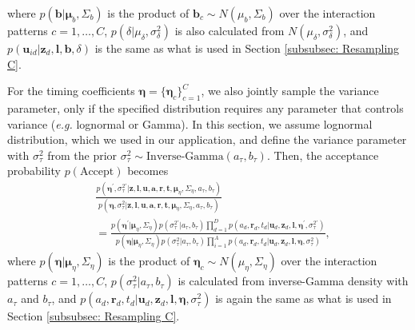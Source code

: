 \documentclass[twoside]{article}
\begin{document}
     	      where $p(\boldsymbol{b}|\boldsymbol{\mu}_b, \Sigma_b)$ is the product of $\boldsymbol{b}_c\sim N(\mu_{b}, \Sigma_{b})$ over the interaction patterns $c =1,\ldots, C$, $p(\delta|\mu_\delta, \sigma^2_\delta)$ is also calculated from $N(\mu_\delta, \sigma^2_\delta)$, and $p(\boldsymbol{u}_{id}| \boldsymbol{z}_d,  \boldsymbol{l}, \boldsymbol{b}, \delta)$ is the same as what is used in Section \ref{subsubsec: Resampling C}. 
     	       
  For the timing coefficients $\boldsymbol{\eta} =\{\boldsymbol{\eta}_c\}_{c=1}^C$, we also jointly sample the variance parameter, only if the specified distribution requires any parameter that controls variance (\textit{e.g.} lognormal or Gamma). In this section, we assume lognormal distribution, which we used in our application, and define the variance parameter with $\sigma_\tau^2$ from the prior $\sigma_\tau^2 \sim \mbox{Inverse-Gamma}(a_\tau, b_\tau)$. Then, the acceptance probability $p(\mbox{Accept})$ becomes
    \begin{equation*}
    \begin{aligned}
       &\frac{p(\boldsymbol{\eta}^\prime,\sigma_\tau^{2\prime}|  \boldsymbol{z},\boldsymbol{l}, \boldsymbol{u},\boldsymbol{a}, \boldsymbol{r}, \boldsymbol{t},\boldsymbol{\mu}_\eta, \Sigma_\eta, a_\tau, b_\tau)}{p(\boldsymbol{\eta}, \sigma_\tau^{2}|\boldsymbol{z},\boldsymbol{l}, \boldsymbol{u},\boldsymbol{a}, \boldsymbol{r}, \boldsymbol{t},\boldsymbol{\mu}_\eta, \Sigma_\eta, a_\tau, b_\tau)}
       \\& =\frac{p(\boldsymbol{\eta}^\prime|\boldsymbol{\mu}_\eta, \Sigma_\eta) p(\sigma_\tau^{2\prime}|a_\tau, b_\tau)\prod\limits_{d=1}^D p({a}_{d}, \boldsymbol{r}_d, t_d| \boldsymbol{u}_d, \boldsymbol{z}_d,  \boldsymbol{l}, \boldsymbol{\eta}^\prime, \sigma_\tau^{2\prime})}{p(\boldsymbol{\eta}|\boldsymbol{\mu}_\eta, \Sigma_\eta) p(\sigma_\tau^2|a_\tau, b_\tau)\prod\limits_{i=1}^A p({a}_{d}, \boldsymbol{r}_d, t_d| \boldsymbol{u}_d, \boldsymbol{z}_d,  \boldsymbol{l}, \boldsymbol{\eta}, \sigma_\tau^{2})},
    \end{aligned}
    \end{equation*}
       where $p(\boldsymbol{\eta}|\boldsymbol{\mu}_\eta, \Sigma_\eta)$ is the product of $\boldsymbol{\eta}_c\sim N(\mu_{\eta}, \Sigma_{\eta})$ over the interaction patterns $c =1,\ldots, C$, $p(\sigma_\tau^{2}|a_\tau, b_\tau)$ is calculated from inverse-Gamma density with $a_\tau$ and $b_\tau$, and $p({a}_{d}, \boldsymbol{r}_d, t_d| \boldsymbol{u}_d, \boldsymbol{z}_d,  \boldsymbol{l}, \boldsymbol{\eta}, \sigma_\tau^{2})$ is again the same as what is used in Section \ref{subsubsec: Resampling C}. 
       
\end{document}
